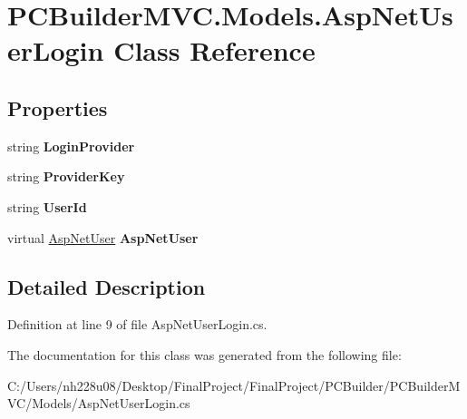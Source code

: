 \hypertarget{class_p_c_builder_m_v_c_1_1_models_1_1_asp_net_user_login}{}\section{P\+C\+Builder\+M\+V\+C.\+Models.\+Asp\+Net\+User\+Login Class Reference}
\label{class_p_c_builder_m_v_c_1_1_models_1_1_asp_net_user_login}
\subsection*{Properties}
\begin{DoxyCompactItemize}
\item 
string {\bfseries Login\+Provider}\hypertarget{class_p_c_builder_m_v_c_1_1_models_1_1_asp_net_user_login_afd4bba05697f6059c5bb725cfe67b8e8}{}\label{class_p_c_builder_m_v_c_1_1_models_1_1_asp_net_user_login_afd4bba05697f6059c5bb725cfe67b8e8}

\item 
string {\bfseries Provider\+Key}\hypertarget{class_p_c_builder_m_v_c_1_1_models_1_1_asp_net_user_login_a97e4012d80f0f5ae777ec65d088775be}{}\label{class_p_c_builder_m_v_c_1_1_models_1_1_asp_net_user_login_a97e4012d80f0f5ae777ec65d088775be}

\item 
string {\bfseries User\+Id}\hypertarget{class_p_c_builder_m_v_c_1_1_models_1_1_asp_net_user_login_a2859dab3356abc6d968042cc40de395a}{}\label{class_p_c_builder_m_v_c_1_1_models_1_1_asp_net_user_login_a2859dab3356abc6d968042cc40de395a}

\item 
virtual \hyperlink{class_p_c_builder_m_v_c_1_1_models_1_1_asp_net_user}{Asp\+Net\+User} {\bfseries Asp\+Net\+User}\hypertarget{class_p_c_builder_m_v_c_1_1_models_1_1_asp_net_user_login_a160b1f3b2b2cfdb125c218180df57bec}{}\label{class_p_c_builder_m_v_c_1_1_models_1_1_asp_net_user_login_a160b1f3b2b2cfdb125c218180df57bec}

\end{DoxyCompactItemize}


\subsection{Detailed Description}


Definition at line 9 of file Asp\+Net\+User\+Login.\+cs.



The documentation for this class was generated from the following file\+:\begin{DoxyCompactItemize}
\item 
C\+:/\+Users/nh228u08/\+Desktop/\+Final\+Project/\+Final\+Project/\+P\+C\+Builder/\+P\+C\+Builder\+M\+V\+C/\+Models/Asp\+Net\+User\+Login.\+cs\end{DoxyCompactItemize}
